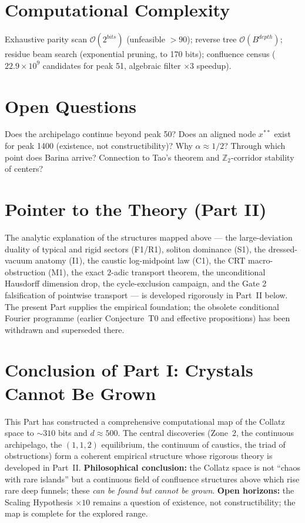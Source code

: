 \documentclass[12pt,a4paper]{article}
\theoremstyle{remark}
\begin{document}
\section{Computational Complexity}
Exhaustive parity scan $\mathcal O(2^{bits})$ (unfeasible $>90$); reverse tree $\mathcal O(B^{depth})$; residue beam search (exponential pruning, to 170 bits); confluence census ($22.9\times10^9$ candidates for peak 51, algebraic filter $\times3$ speedup).

\section{Open Questions}
Does the archipelago continue beyond peak 50? Does an aligned node $x^{**}$ exist for peak 1400 (existence, not constructibility)? Why $\alpha\approx1/2$? Through which point does Barina arrive? Connection to Tao's theorem and $\mathbb Z_2$-corridor stability of centers?

\section*{Pointer to the Theory (Part II)}
The analytic explanation of the structures mapped above --- the large-deviation duality of typical and rigid sectors (F1/R1), soliton dominance (S1), the dressed-vacuum anatomy (I1), the caustic log-midpoint law (C1), the CRT macro-obstruction (M1), the exact $2$-adic transport theorem, the unconditional Hausdorff dimension drop, the cycle-exclusion campaign, and the Gate 2 falsification of pointwise transport --- is developed rigorously in Part~II below. The present Part supplies the empirical foundation; the obsolete conditional Fourier programme (earlier Conjecture~T0 and effective propositions) has been withdrawn and superseded there.

\section{Conclusion of Part I: Crystals Cannot Be Grown}
This Part has constructed a comprehensive computational map of the Collatz space to $\sim310$ bits and $d\approx500$. The central discoveries (Zone~2, the continuous archipelago, the $(1,1,2)$ equilibrium, the continuum of caustics, the triad of obstructions) form a coherent empirical structure whose rigorous theory is developed in Part~II. \textbf{Philosophical conclusion:} the Collatz space is not ``chaos with rare islands'' but a continuous field of confluence structures above which rise rare deep funnels; these \emph{can be found but cannot be grown}. \textbf{Open horizons:} the Scaling Hypothesis $\times10$ remains a question of existence, not constructibility; the map is complete for the explored range.
\end{document}
